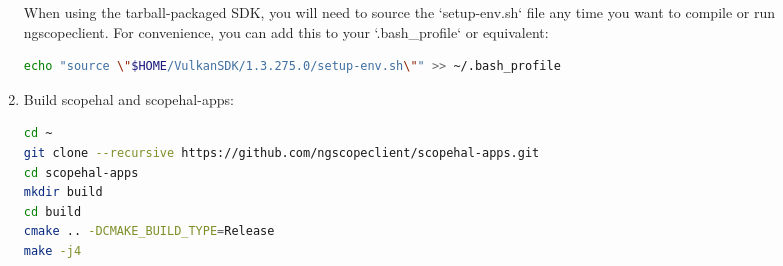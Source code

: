 \begin{enumerate}
When using the tarball-packaged SDK, you will need to source the `setup-env.sh` file any time you want to compile
or run ngscopeclient. For convenience, you can add this to your `.bash\_profile` or equivalent:
\begin{lstlisting}[language=sh, numbers=none]
echo "source \"$HOME/VulkanSDK/1.3.275.0/setup-env.sh\"" >> ~/.bash_profile
\end{lstlisting}

\item Build scopehal and scopehal-apps:

\begin{lstlisting}[language=sh, numbers=none]
cd ~
git clone --recursive https://github.com/ngscopeclient/scopehal-apps.git
cd scopehal-apps
mkdir build
cd build
cmake .. -DCMAKE_BUILD_TYPE=Release
make -j4
\end{lstlisting}

\end{enumerate}


